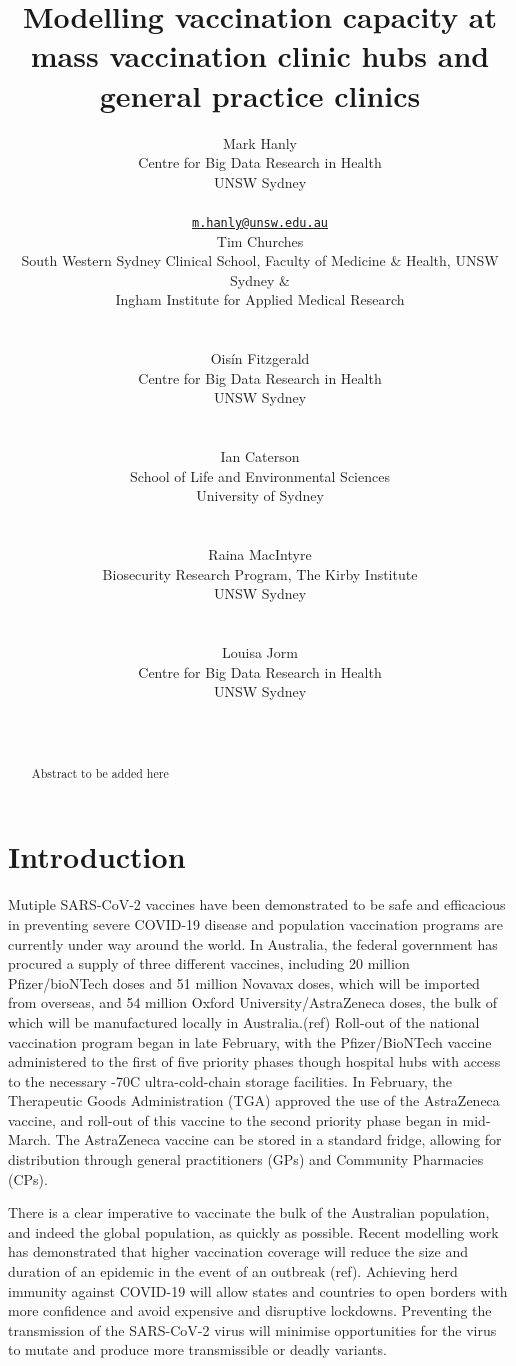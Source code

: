 \documentclass{article}
\title{Modelling vaccination capacity at mass vaccination clinic hubs
and general practice clinics}
\author{
    Mark Hanly
   \\
    Centre for Big Data Research in Health \\
    UNSW Sydney \\
   \\
  \texttt{\href{mailto:m.hanly@unsw.edu.au}{\nolinkurl{m.hanly@unsw.edu.au}}} \\
   \And
    Tim Churches
   \\
    South Western Sydney Clinical School, Faculty of Medicine \& Health,
UNSW Sydney \& \\
    Ingham Institute for Applied Medical Research \\
   \\
  \texttt{} \\
   \And
    Oisín Fitzgerald
   \\
    Centre for Big Data Research in Health \\
    UNSW Sydney \\
   \\
  \texttt{} \\
   \And
    Ian Caterson
   \\
    School of Life and Environmental Sciences \\
    University of Sydney \\
   \\
  \texttt{} \\
   \And
    Raina MacIntyre
   \\
    Biosecurity Research Program, The Kirby Institute \\
    UNSW Sydney \\
   \\
  \texttt{} \\
   \And
    Louisa Jorm
   \\
    Centre for Big Data Research in Health \\
    UNSW Sydney \\
   \\
  \texttt{} \\
  }
\begin{document}
\maketitle

\def\tightlist{}


\begin{abstract}
Abstract to be added here
\end{abstract}


\newpage

\hypertarget{introduction}{%
\section{Introduction}\label{introduction}}

Mutiple SARS-CoV-2 vaccines have been demonstrated to be safe and
efficacious in preventing severe COVID-19 disease and population
vaccination programs are currently under way around the world. In
Australia, the federal government has procured a supply of three
different vaccines, including 20 million Pfizer/bioNTech doses and 51
million Novavax doses, which will be imported from overseas, and 54
million Oxford University/AstraZeneca doses, the bulk of which will be
manufactured locally in Australia.(ref) Roll-out of the national
vaccination program began in late February, with the Pfizer/BioNTech
vaccine administered to the first of five priority phases though
hospital hubs with access to the necessary -70\degree C ultra-cold-chain
storage facilities. In February, the Therapeutic Goods Administration
(TGA) approved the use of the AstraZeneca vaccine, and roll-out of this
vaccine to the second priority phase began in mid-March. The AstraZeneca
vaccine can be stored in a standard fridge, allowing for distribution
through general practitioners (GPs) and Community Pharmacies (CPs).

There is a clear imperative to vaccinate the bulk of the Australian
population, and indeed the global population, as quickly as possible.
Recent modelling work has demonstrated that higher vaccination coverage
will reduce the size and duration of an epidemic in the event of an
outbreak (ref). Achieving herd immunity against COVID-19 will allow
states and countries to open borders with more confidence and avoid
expensive and disruptive lockdowns. Preventing the transmission of the
SARS-CoV-2 virus will minimise opportunities for the virus to mutate and
produce more transmissible or deadly variants.
\end{document}
